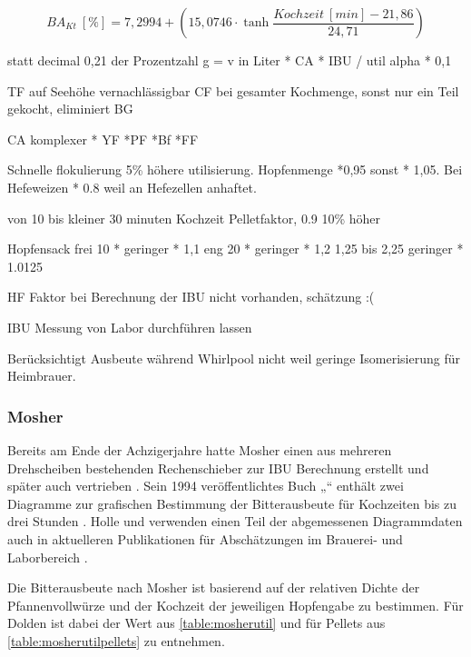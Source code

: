 \documentclass[a4paper,parskip=half]{scrartcl}
\newcommand{\BAKt}{{\mathit{BA}}_{\mathit{Kt}}}
\newcommand{\umin}{\:[\mathit{min}]}
\newcommand{\uper}{\:[\%]}
\begin{document}
\begin{equation}
\BAKt \uper = 7,2994 + \left(15,0746 \cdot \tanh{\frac{\mathit{Kochzeit} \umin - 21,86}{24,71}}\right)
\label{eq:garetzutil}
\end{equation}


statt decimal 0,21 der Prozentzahl 
g = v in Liter * CA * IBU / util  alpha * 0,1

TF auf Seehöhe vernachlässigbar
CF bei gesamter Kochmenge, sonst nur ein Teil gekocht, eliminiert BG

CA komplexer * YF *PF *Bf *FF

\parencite[140\psq]{Garetz1994} 
Schnelle flokulierung 5\% höhere utilisierung. Hopfenmenge *0,95
sonst * 1,05. Bei Hefeweizen * 0.8 weil an Hefezellen anhaftet.

von 10 bis kleiner 30 minuten Kochzeit Pelletfaktor, 0.9 10\% höher

Hopfensack
frei 10 * geringer * 1,1
eng 20 * geringer * 1,2
1,25 bis 2,25 geringer * 1.0125

HF Faktor bei Berechnung der IBU nicht vorhanden, schätzung :(

\parencite[134-144]{Garetz1994} 

IBU Messung von Labor durchführen lassen
\parencite[145]{Garetz1994} 

Berücksichtigt Ausbeute während Whirlpool nicht weil geringe
Isomerisierung für Heimbrauer.
\parencite[167]{Garetz1994} 

\subsubsection*{Mosher}

Bereits am Ende der Achzigerjahre hatte Mosher einen aus mehreren
Drehscheiben bestehenden Rechenschieber zur IBU Berechnung erstellt und später
auch vertrieben \parencite{Mosher2022}. Sein 1994 veröffentlichtes
Buch „“ enthält zwei Diagramme zur grafischen
Bestimmung der Bitterausbeute für Kochzeiten bis zu drei Stunden
\parencite[160\psq]{Mosher1994}. Holle und \citeauthor{Thesseling2019} verwenden
einen Teil der abgemessenen Diagrammdaten auch in aktuelleren Publikationen für Abschätzungen
im Brauerei- und Laborbereich \parencites[51]{Holle2010}[9]{Thesseling2019}.

Die Bitterausbeute nach Mosher ist basierend auf der relativen Dichte der
Pfannenvollwürze und der Kochzeit der jeweiligen Hopfengabe zu bestimmen.
Für Dolden ist dabei der Wert aus \autoref{table:mosherutil} und für Pellets aus
\autoref{table:mosherutilpellets} zu entnehmen.
\end{document}
